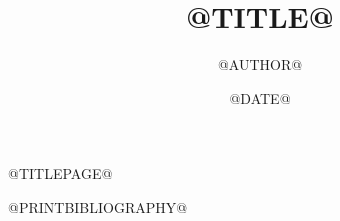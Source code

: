 \documentclass[aspectratio=169,t]{beamer}
\title{@TITLE@}
\author{@AUTHOR@}
\date{@DATE@}
\begin{document}
\raggedright\MarkTwoTeXBody\MarkTwoTeXMathSpacing
\setlength{\parskip}{10bp}
@TITLEPAGE@

@PRINTBIBLIOGRAPHY@
\end{document}
